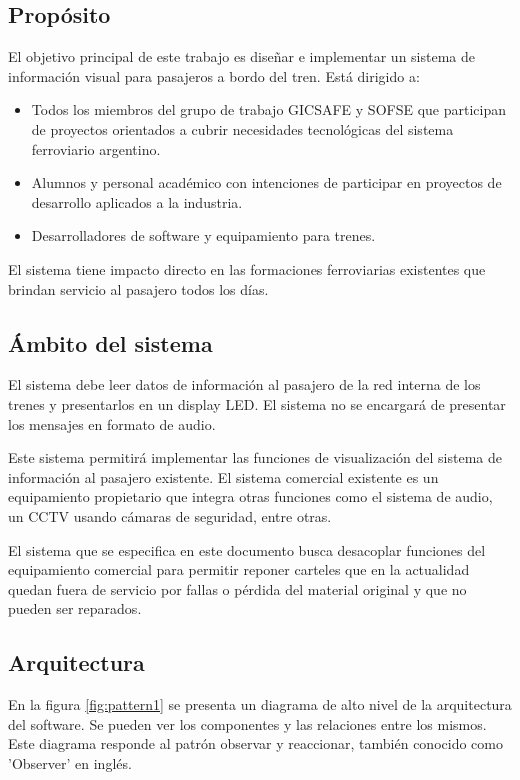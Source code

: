 \documentclass[
11pt, %
]{charter}
\begin{document}
\subsection{Propósito}
El objetivo principal de este trabajo es diseñar e implementar un sistema de información visual
para pasajeros a bordo del tren.
Está dirigido a:
\begin{itemize}
\item Todos los miembros del grupo de trabajo GICSAFE y SOFSE que participan de
proyectos orientados a cubrir necesidades tecnológicas del sistema ferroviario
argentino.
\item Alumnos y personal académico con intenciones de participar en proyectos de
desarrollo aplicados a la industria.
\item Desarrolladores de software y equipamiento para trenes.
\end{itemize}
El sistema tiene impacto directo en las formaciones ferroviarias existentes que brindan servicio al pasajero todos los días.

\subsection{Ámbito del sistema}
El sistema debe leer datos de información al pasajero de la red interna de los trenes y
presentarlos en un display LED. El sistema no se encargará de presentar los mensajes en
formato de audio.

Este sistema permitirá implementar las funciones de visualización del sistema de información al
pasajero existente. El sistema comercial existente es un equipamiento propietario que integra
otras funciones como el sistema de audio, un CCTV usando cámaras de seguridad, entre otras.

El sistema que se especifica en este documento busca desacoplar funciones del equipamiento
comercial para permitir reponer carteles que en la actualidad quedan fuera de servicio por fallas
o pérdida del material original y que no pueden ser reparados.
\subsection{Arquitectura}
En la figura \ref{fig:pattern1} se presenta un diagrama de alto nivel de la arquitectura del software. Se pueden
ver los componentes y las relaciones entre los mismos. Este diagrama responde al patrón
observar y reaccionar, también conocido como 'Observer' en inglés.
\end{document}
